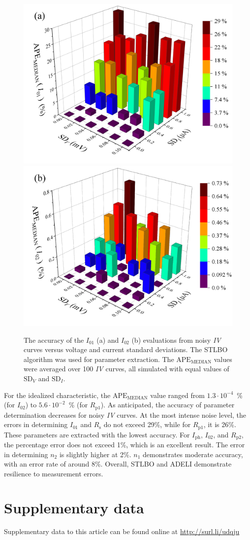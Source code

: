 \documentclass[a4paper,fleqn]{cas-sc}
\begin{document}
\begin{figure}[]
	\centering
		\includegraphics[width=0.40\columnwidth]{Fig13a}
		\includegraphics[width=0.45\columnwidth]{Fig13b}
	  \caption{The accuracy of the $I_{01}$ (a) and $I_{02}$ (b) evaluations from noisy \emph{IV} curves versus voltage and current standard deviations.
               The STLBO algorithm was used for parameter extraction.
               The $\mathrm{APE}_\mathrm{MEDIAN}$ values were averaged over 100 \emph{IV} curves, all simulated with equal values of $\mathrm{SD}_V$ and $\mathrm{SD}_I$.
}\label{figNoisy}
\end{figure}

For the idealized characteristic, the $\mathrm{APE}_\mathrm{MEDIAN}$
value ranged from $1.3\cdot10^{-4}$~\% (for $I_{02}$) to $5.6\cdot10^{-2}$~\% (for $R_\mathrm{p1}$).
As anticipated, the accuracy of parameter determination decreases for noisy \emph{IV} curves.
At the most intense noise level, the errors in determining $I_{01}$ and $R_\mathrm{s}$ do not exceed 29\%,
while for $R_\mathrm{p1}$, it is 26\%.
These parameters are extracted with the lowest accuracy.
For $I_\mathrm{ph}$, $I_{02}$, and $R_\mathrm{p2}$,
the percentage error does not exceed 1\%, which is an excellent result.
The error in determining $n_2$ is slightly higher at 2\%.
$n_1$ demonstrates moderate accuracy, with an error rate of around 8\%.
Overall, STLBO and ADELI demonstrate resilience to measurement errors.



\section{Supplementary data}\label{SuplData}
Supplementary data to this article can be found online at
\url{http://surl.li/udqju}




\end{document}
